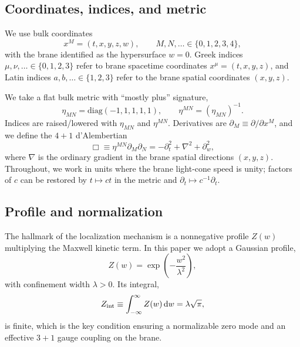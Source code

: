 \documentclass[11pt]{article}
\newcommand{\dd}{\mathrm d}
\newcommand{\Z}{Z}
\newcommand{\lam}{\lambda}      %
\newcommand{\Zint}{Z_{\rm int}} %
\begin{document}
\subsection{Coordinates, indices, and metric}
\label{sec:coords_metric}

We use bulk coordinates
\begin{equation}
  x^M = (t,x,y,z,w),
  \qquad
  M,N,\ldots \in \{0,1,2,3,4\},
\end{equation}
with the brane identified as the hypersurface \(w=0\). Greek indices
\(\mu,\nu,\ldots \in \{0,1,2,3\}\) refer to brane spacetime coordinates
\(x^\mu=(t,x,y,z)\), and Latin indices \(a,b,\ldots\in\{1,2,3\}\) refer to the
brane spatial coordinates \((x,y,z)\).

We take a flat bulk metric with ``mostly plus'' signature,
\begin{equation}
  \eta_{MN}=\mathrm{diag}(-1,1,1,1,1),
  \qquad
  \eta^{MN}=(\eta_{MN})^{-1}.
\end{equation}
Indices are raised/lowered with \(\eta_{MN}\) and \(\eta^{MN}\).
Derivatives are \(\partial_M\equiv \partial/\partial x^M\), and we define the
\(4+1\) d'Alembertian
\begin{equation}
  \Box \equiv \eta^{MN}\partial_M\partial_N
  = -\partial_t^2 + \nabla^2 + \partial_w^2,
\end{equation}
where \(\nabla\) is the ordinary gradient in the brane spatial directions
\((x,y,z)\). Throughout, we work in units where the brane light-cone speed is
unity; factors of \(c\) can be restored by \(t\mapsto ct\) in the metric and
\(\partial_t\mapsto c^{-1}\partial_t\).

\subsection{Profile and normalization}
\label{sec:profile}

The hallmark of the localization mechanism is a nonnegative profile \(\Z(w)\)
multiplying the Maxwell kinetic term. In this paper we adopt a Gaussian profile,
\begin{equation}
  \Z(w) = \exp\!\left(-\frac{w^2}{\lam^2}\right),
  \label{eq:Z_gaussian}
\end{equation}
with confinement width \(\lam>0\). Its integral,
\begin{equation}
  \Zint \equiv \int_{-\infty}^{\infty}\Z(w)\,\dd w
  = \lam\sqrt{\pi},
  \label{eq:Zint}
\end{equation}
is finite, which is the key condition ensuring a normalizable zero mode and an
effective \(3+1\) gauge coupling on the brane.
\end{document}

